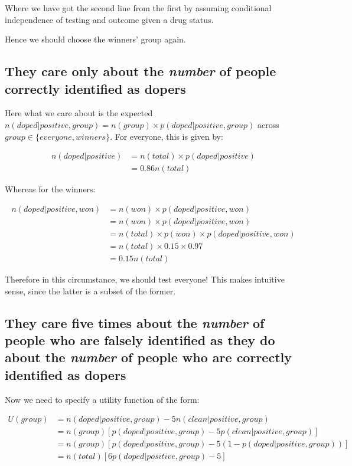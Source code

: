 \documentclass[11pt,fullpage]{book}
\begin{document}
Where we have got the second line from the first by assuming conditional independence of testing and outcome given a drug status.

Hence we should choose the winners' group again.

\subsection{They care only about the \textit{number} of people correctly identified as dopers}
Here what we care about is the expected $n(doped|positive,group) = n(group)\times p(doped|positive,group)$ across $group\in\{everyone,winners\}$. For everyone, this is given by:

\begin{equation}
\begin{align}
n(doped|positive) &= n(total) \times p(doped|positive)\\
&= 0.86 n(total)
\end{align}
\end{equation}

Whereas for the winners:

\begin{equation}
\begin{align}
n(doped|positive,won) &= n(won) \times p(doped|positive,won)\\
&= n(won)\times p(doped|positive,won)\\
&= n(total)\times p(won)\times p(doped|positive,won)\\
&= n(total)\times 0.15 \times 0.97\\
&= 0.15 n(total)
\end{align}
\end{equation}

Therefore in this circumstance, we should test everyone! This makes intuitive sense, since the latter is a subset of the former.

\subsection{They care five times about the \textit{number} of people who are falsely identified as they do about the \textit{number} of people who are correctly identified as dopers}

Now we need to specify a utility function of the form:

\begin{equation}
\begin{align}
U(group) &= n(doped|positive,group) - 5 n(clean|positive,group)\\
&= n(group)\left[p(doped|positive,group) - 5 p(clean|positive,group)\right]\\
&= n(group)\left[p(doped|positive,group) - 5 (1-p(doped|positive,group))\right]\\
&= n(total)\left[6 p(doped|positive,group) - 5\right]
\end{align}
\end{equation}
\end{document}
